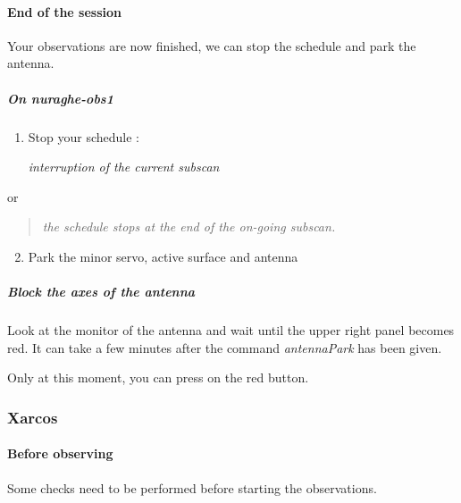 \documentclass[letterpaper,10pt,english]{sphinxmanual}
\begin{document}
\paragraph{End of the session}
\label{SpectralLine/C-band/SARDARA/stop-session:end-of-the-session}\label{SpectralLine/C-band/SARDARA/stop-session::doc}
Your observations are now finished, we can stop the schedule and park
the antenna.


\subparagraph{On nuraghe-obs1}
\label{SpectralLine/C-band/SARDARA/stop-session:on-nuraghe-obs1}\begin{enumerate}
\item {} 
Stop your schedule :

   \emph{interruption of the current subscan}

\end{enumerate}

or
\begin{quote}

    \emph{the schedule stops at the end of the on-going subscan.}
\end{quote}
\begin{enumerate}
\setcounter{enumi}{1}
\item {} 
Park the minor servo, active surface and antenna





\end{enumerate}


\subparagraph{Block the axes of the antenna}
\label{SpectralLine/C-band/SARDARA/stop-session:block-the-axes-of-the-antenna}
Look at the monitor of the antenna and wait until the upper right
panel becomes red. It can take a few minutes after the command
\emph{antennaPark} has been given.

Only at this moment, you can press on the red button.


\subsubsection{Xarcos}
\label{SpectralLine/C-band/Xarcos/index:xarcos}\label{SpectralLine/C-band/Xarcos/index::doc}

\paragraph{Before observing}
\label{SpectralLine/C-band/Xarcos/before-obs:before-observing}\label{SpectralLine/C-band/Xarcos/before-obs::doc}
Some checks need to be performed before starting the observations.
\end{document}
